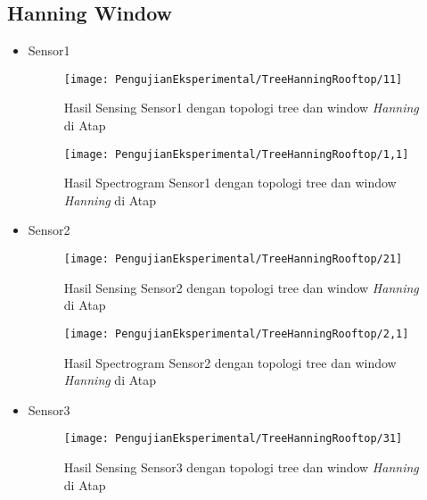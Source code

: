 \subsection{Hanning Window}
\begin{itemize}
\item Sensor1
\begin{figure}[H]
	\centering
	\texttt{[image: PengujianEksperimental/TreeHanningRooftop/11]}
	\caption[Hasil Sensing Sensor1 dengan topologi tree dan window {\it Hanning} di Atap]{Hasil Sensing Sensor1 dengan topologi tree dan window {\it Hanning} di Atap} 
	\label{fig:hasilAtapTreeHann11}
\end{figure}

\begin{figure}[H]
	\centering
	\texttt{[image: PengujianEksperimental/TreeHanningRooftop/1,1]}
	\caption[Hasil Spectrogram Sensor1 dengan topologi tree dan window {\it Hanning} di Atap]{Hasil Spectrogram Sensor1 dengan topologi tree dan window {\it Hanning} di Atap} 
	\label{fig:hasilAtapTreeHann1,1}
\end{figure}

\item Sensor2
\begin{figure}[H]
	\centering
	\texttt{[image: PengujianEksperimental/TreeHanningRooftop/21]}
	\caption[Hasil Sensing Sensor2 dengan topologi tree dan window {\it Hanning} di Atap]{Hasil Sensing Sensor2 dengan topologi tree dan window {\it Hanning} di Atap} 
	\label{fig:hasilAtapTreeHann21}
\end{figure}

\begin{figure}[H]
	\centering
	\texttt{[image: PengujianEksperimental/TreeHanningRooftop/2,1]}
	\caption[Hasil Spectrogram Sensor2 dengan topologi tree dan window {\it Hanning} di Atap]{Hasil Spectrogram Sensor2 dengan topologi tree dan window {\it Hanning} di Atap} 
	\label{fig:hasilAtapTreeHann2,1}
\end{figure}

\item Sensor3
\begin{figure}[H]
	\centering
	\texttt{[image: PengujianEksperimental/TreeHanningRooftop/31]}
	\caption[Hasil Sensing Sensor3 dengan topologi tree dan window {\it Hanning} di Atap]{Hasil Sensing Sensor3 dengan topologi tree dan window {\it Hanning} di Atap} 
	\label{fig:hasilAtapTreeHann31}
\end{figure}


\end{itemize}
